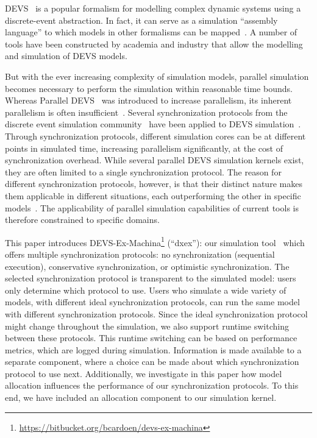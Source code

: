 \textsf{DEVS}~\cite{ClassicDEVS} is a popular formalism for modelling complex dynamic systems using a discrete-event abstraction.
In fact, it can serve as a simulation ``assembly language'' to which models in other formalisms can be mapped~\cite{DEVSbase}.
A number of tools have been constructed by academia and industry that allow the modelling and simulation of \textsf{DEVS} models.

But with the ever increasing complexity of simulation models, parallel simulation becomes necessary to perform the simulation within reasonable time bounds.
Whereas \textsf{Parallel DEVS}~\cite{ParallelDEVS} was introduced to increase parallelism, its inherent parallelism is often insufficient~\cite{Himmelspach}.
Several synchronization protocols from the discrete event simulation community~\cite{FujimotoBook} have been applied to \textsf{DEVS} simulation~\cite{globaltimewarp}.
Through synchronization protocols, different simulation cores can be at different points in simulated time, increasing parallelism significantly, at the cost of synchronization overhead.
While several parallel \textsf{DEVS} simulation kernels exist, they are often limited to a single synchronization protocol.
The reason for different synchronization protocols, however, is that their distinct nature makes them applicable in different situations, each outperforming the other in specific models~\cite{Jafer}.
The applicability of parallel simulation capabilities of current tools is therefore constrained to specific domains.

This paper introduces DEVS-Ex-Machina\footnote{\url{https://bitbucket.org/bcardoen/devs-ex-machina}} (``dxex''): our simulation tool~\cite{dxex} which offers multiple synchronization protocols: no synchronization (sequential execution), conservative synchronization, or optimistic synchronization.
The selected synchronization protocol is transparent to the simulated model: users only determine which protocol to use.
Users who simulate a wide variety of models, with different ideal synchronization protocols, can run the same model with different synchronization protocols.
Since the ideal synchronization protocol might change throughout the simulation, we also support runtime switching between these protocols.
This runtime switching can be based on performance metrics, which are logged during simulation.
Information is made available to a separate component, where a choice can be made about which synchronization protocol to use next. %
Additionally, we investigate in this paper how model allocation influences the performance of our synchronization protocols.
To this end, we have included an allocation component to our simulation kernel.

